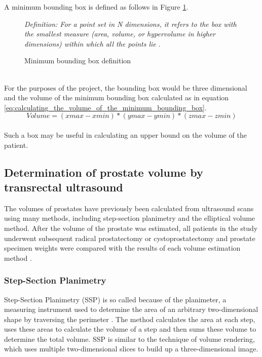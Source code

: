 A minimum bounding box is defined as follows in Figure \ref{fig:bounding_box_definition}.\\

\begin{figure}[h]
\textit{Definition: For a point set in N dimensions, it refers to the box with the smallest measure (area, volume, or hypervolume in higher dimensions) within which all the points lie} \cite{Barequet2001}.
\caption {Minimum bounding box definition}
\label{fig:bounding_box_definition}
\end{figure}\\

For the purposes of the project, the bounding box would be three dimensional and the volume of the minimum bounding box calculated as in equation \ref{eq:calculating_the_volume_of_the_minimum_bounding_box}.\\

\begin{equation}
    \label{eq:calculating_the_volume_of_the_minimum_bounding_box}
    Volume = (xmax -xmin) * (ymax - ymin) * (zmax - zmin)
\end{equation}\\

Such a box may be useful in calculating an upper bound on the volume of the patient.\\

\subsection{Determination of prostate volume by transrectal ultrasound}
The volumes of prostates have previously been calculated from ultrasound scans using many methods, including step-section planimetry and the elliptical volume method. After the volume of the prostate was estimated, all patients in the study underwent subsequent radical prostatectomy or cystoprostatectomy and prostate specimen weights were compared with the results of each volume estimation method \cite{K1991}.\\ 

\subsubsection{Step-Section Planimetry}
\label{research:ssp}
Step-Section Planimetry (SSP) is so called because of the planimeter, a measuring instrument used to determine the area of an arbitrary two-dimensional shape by traversing the perimeter \cite{Bryant2011}. 
The method calculates the area at each step, uses these areas to calculate the volume of a step and then sums these volume to determine the total volume. SSP is similar to the technique of volume rendering, which uses multiple two-dimensional slices to build up a three-dimensional image.\\

